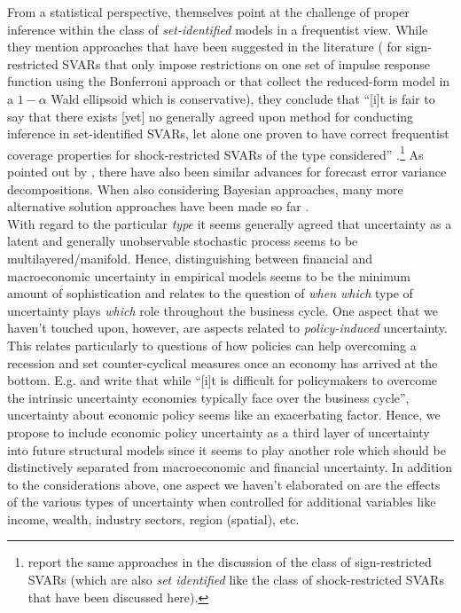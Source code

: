 \documentclass[a4paper,11pt,listof=nochaptergap,oneside,pointednumbers,bibtotoc,bigheadings,liststotoc,hidelinks]{scrbook}
\theoremstyle{mysatz}
\theoremstyle{mydefinition}
\theoremstyle{mytheorem}
\theoremstyle{mybemerkung}
\begin{document}
From a statistical perspective, \citet{ludvigsonetal:18, ludvigsonetal:19} themselves point at the challenge of proper inference within the class of \textit{set-identified} models in a frequentist view. While they mention approaches that have been suggested in the literature (\citet{granzieraetal:18} for sign-restricted SVARs that only impose restrictions on one set of impulse response function using the Bonferroni approach or \citet{gafarovetal:15} that collect the reduced-form model in a $1-\alpha$ Wald ellipsoid which is conservative), they conclude that ``[i]t is fair to say that there exists [yet] no generally agreed upon method for conducting inference in set-identified SVARs, let alone one proven to have correct frequentist coverage properties for shock-restricted SVARs of the type considered'' \citet[p. 10]{ludvigsonetal:20a}.\footnote{\citet{lutkepohlkilian:17} report the same approaches in the discussion of the class of sign-restricted SVARs (which are also \textit{set identified} like the class of shock-restricted SVARs that have been discussed here).} As pointed out by \citet{lutkepohlkilian:17}, there have also been similar advances for forecast error variance decompositions. When also considering Bayesian approaches, many more alternative solution approaches have been made so far \citep{lutkepohlkilian:17}.\\

With regard to the particular \textit{type} it seems generally agreed that uncertainty as a latent and generally unobservable stochastic process seems to be multilayered/manifold. Hence, distinguishing between financial and macroeconomic uncertainty in empirical models seems to be the minimum amount of sophistication and relates to the question of \textit{when which} type of uncertainty plays \textit{which} role throughout the business cycle. One aspect that we haven't touched upon, however, are aspects related to \textit{policy-induced} uncertainty. This relates particularly to questions of how policies can help overcoming a recession and set counter-cyclical measures once an economy has arrived at the bottom. E.g. \citet[p. 41]{bloometal:13} and \citet{IMF:12} write that while ``[i]t is difficult for policymakers to overcome the intrinsic uncertainty economies typically face over the business cycle'', uncertainty about economic policy seems like an exacerbating factor. Hence, we propose to include economic policy uncertainty as a third layer of uncertainty into future structural models since it seems to play another role which should be distinctively separated from macroeconomic and financial uncertainty. In addition to the considerations above, one aspect we haven't elaborated on are the effects of the various types of uncertainty when controlled for additional variables like income, wealth, industry sectors, region (spatial), etc. 
\end{document}
